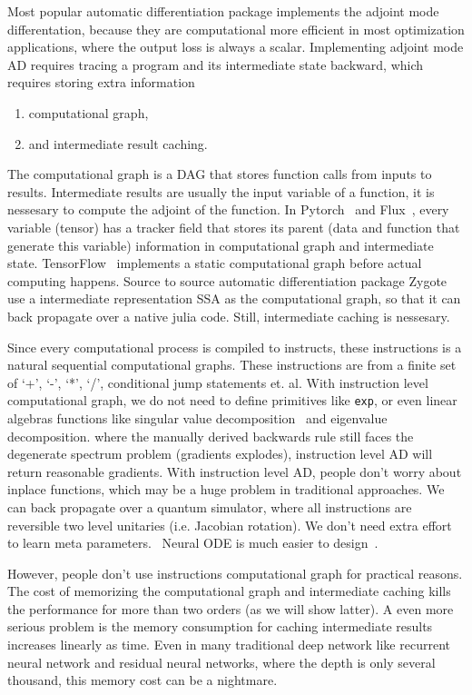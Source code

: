 \documentclass[aps,twocolumn,longbibliography,english,superscriptaddress,prr]{revtex4-1}
\newcommand{\<}{\langle}
\renewcommand{\>}{\rangle}
\begin{document}
Most popular automatic differentiation package implements the adjoint mode differentation, because they are computational more efficient in most optimization applications, where the output loss is always a scalar.
Implementing adjoint mode AD requires tracing a program and its intermediate state backward, which requires storing extra information
\begin{enumerate}
    \item computational graph,
    \item and intermediate result caching.
\end{enumerate}
The computational graph is a DAG that stores function calls from inputs to results. Intermediate results are usually the input variable of a function, it is nessesary to compute the adjoint of the function.
In Pytorch~\cite{Paszke2017} and Flux~\cite{FluxPaper}, every variable (tensor) has a tracker field that stores its parent (data and function that generate this variable) information in computational graph and intermediate state. TensorFlow~\cite{Tensorflow2015} implements a static computational graph before actual computing happens.
Source to source automatic differentiation package Zygote~\cite{Innes2019} use a intermediate representation SSA as the computational graph, so that it can back propagate over a native julia code. Still, intermediate caching is nessesary.

Since every computational process is compiled to instructs, these instructions is a natural sequential computational graphs. These instructions are from a finite set of `+', `-', `*', `/', conditional jump statements et. al. With instruction level computational graph, we do not need to define primitives like \texttt{exp}, or even linear algebras functions like singular value decomposition~\cite{} and eigenvalue decomposition. where the manually derived backwards rule still faces the degenerate spectrum problem (gradients explodes), instruction level AD will return reasonable gradients. With instruction level AD, people don't worry about inplace functions, which may be a huge problem in traditional approaches. We can back propagate over a quantum simulator, where all instructions are reversible two level unitaries (i.e. Jacobian rotation).
We don't need extra effort to learn meta parameters.~\cite{} Neural ODE is much easier to design~\cite{Chen2018}.

However, people don't use instructions computational graph for practical reasons. The cost of memorizing the computational graph and intermediate caching kills the performance for more than two orders (as we will show latter).
A even more serious problem is the memory consumption for caching intermediate results increases linearly as time. Even in many traditional deep network like recurrent neural network and residual neural networks, where the depth is only several thousand, this memory cost can be a nightmare.
\end{document}
